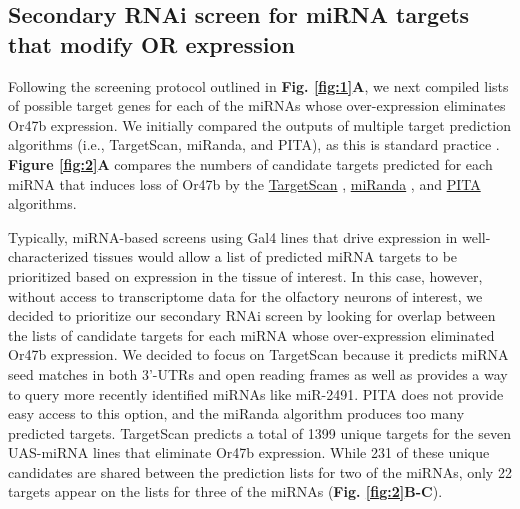 \subsection*{Secondary RNAi screen for miRNA targets that modify OR expression}

Following the screening protocol outlined in \textbf{Fig. \ref{fig:1}A}, we next compiled lists of possible target genes for each of the miRNAs whose over-expression eliminates Or47b expression.
We initially compared the outputs of multiple target prediction algorithms (i.e., TargetScan, miRanda, and PITA), as this is standard practice \cite{am_Namkoong_Lee_Chung_Kim_2009,agen_Okamura_Perrimon_Lai_2007}.
\textbf{Figure \ref{fig:2}A} compares the numbers of candidate targets predicted for each miRNA that induces loss of Or47b by the \href{http://www.targetscan.org/fly_12/}{TargetScan} \cite{ohnston_Kellis_Bartel_Lai_2007}, \href{http://www.microrna.org}{miRanda} \cite{Gaul_Tuschl_Sander_Marks_2003}, and \href{http://genie.weizmann.ac.il/pubs/mir07/mir07_dyn_data.html}{PITA} \cite{ino_Unnerstall_Gaul_Segal_2007} algorithms.

Typically, miRNA-based screens using Gal4 lines that drive expression in well-characterized tissues would allow a list of predicted miRNA targets to be prioritized based on expression in the tissue of interest.
In this case, however, without access to transcriptome data for the olfactory neurons of interest, we decided to prioritize our secondary RNAi screen by looking for overlap between the lists of candidate targets for each miRNA whose over-expression eliminated Or47b expression.
We decided to focus on TargetScan because it predicts miRNA seed matches in both 3'-UTRs and open reading frames as well as provides a way to query more recently identified miRNAs like miR-2491.
PITA does not provide easy access to this option, and the miRanda algorithm produces too many predicted targets.
TargetScan predicts a total of 1399 unique targets for the seven UAS-miRNA lines that eliminate Or47b expression.
While 231 of these unique candidates are shared between the prediction lists for two of the miRNAs, only 22 targets appear on the lists for three of the miRNAs (\textbf{Fig. \ref{fig:2}B-C}).

